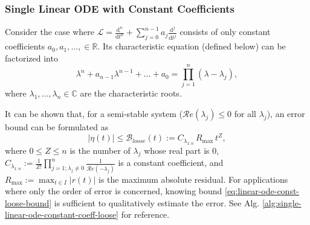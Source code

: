 \documentclass[accepted]{uai2023}
\newcommand{\Err}{\eta}
\newcommand{\Bound}{\mathcal{B}}
\renewcommand{\L}{\mathcal{L}}
\renewcommand{\Re}[1]{\mathcal{R}e\left(#1\right)}
\begin{document}
\subsubsection{Single Linear ODE with Constant Coefficients}\label{section:single-linear-ode-with-constant-coefficients}
    Consider the case where $\L = \frac{\mathrm{d}^n}{\mathrm{d}t^n} + \sum_{j=0}^{n - 1} a_j \frac{\mathrm{d}^j}{\mathrm{d}t^j}$ consists of only constant coefficients $a_0, a_1, \dots, \in \mathbb{R}$.
    Its characteristic equation (defined below) can be factorized into
    {
        \small
        \begin{equation} \label{eq:single-linear-ode-characteristic-polynomial-factorization}
            \lambda^n + a_{n-1}\lambda^{n-1} + \dots + a_0 = \prod_{j=1}^{n}(\lambda - \lambda_j),
        \end{equation}
    }
    where $\lambda_1, \dots, \lambda_n \in \mathbb{C}$ are the characteristic roots. 

    It can be shown that, for a semi-stable system ($\Re{\lambda_j} \leq 0$ for all $\lambda_j$), an error bound can be formulated as
    \begin{equation} \label{eq:linear-ode-const-loose-bound}
        \left|\Err(t)\right| \leq \Bound_{loose}(t) := C_{\lambda_{1:n}}\, R_{\max}\, t^{Z},
    \end{equation}
    where $0\leq Z \leq n$ is the number of $\lambda_j$ whose real part is $0$, $C_{\lambda_{1:n}} := \frac{1}{Z!}\prod_{j=1; \lambda_j\neq 0}^{n} \frac{1}{\Re{-\lambda_j}}$ is a constant coefficient, and $R_{\max}:=\max_{t\in I} |r(t)|$ is the maximum absolute residual. 
    For applications where only the order of error is concerned, knowing bound \ref{eq:linear-ode-const-loose-bound} is sufficient to qualitatively estimate the error. See Alg. \ref{alg:single-linear-ode-constant-coeff-loose} for reference.
\end{document}
